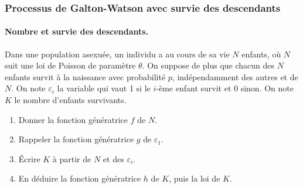 \subsubsection{Processus de Galton-Watson avec survie des descendants}

\paragraph{Nombre et survie des descendants.}
Dans une population asexuée, un individu a au cours de sa vie $N$ enfants, où $N$ suit une loi de Poisson de paramètre $\theta$. On suppose de plus que chacun des $N$ enfants survit à la naissance avec probabilité $p$, indépendamment des autres et de $N$. On note $\varepsilon_i$ la variable qui vaut 1 si le $i$-ème enfant survit et 0 sinon. On note $K$ le nombre d'enfants survivants.

\begin{enumerate}
  \item Donner la fonction génératrice $f$ de $N$.
  \item Rappeler la fonction génératrice $g$ de $\varepsilon_1$.
  \item \'Ecrire $K$ à partir de $N$ et des $\varepsilon_i$.
  \item En déduire la fonction génératrice $h$ de $K$, puis la loi de $K$.
\end{enumerate}

